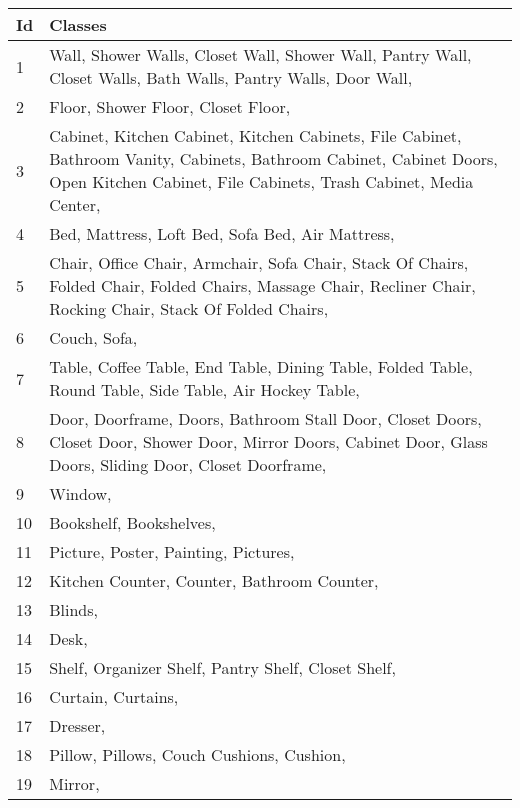     \begin{table}
    \begin{center}
    	\begin{tabular}{ | l | p{17cm} |}
    		\hline
    		
    		\cellcolor{purple!30}Id & \cellcolor{purple!30}Classes \\ \hline
    		
    		1 & Wall, Shower Walls, Closet Wall, Shower Wall, Pantry Wall, Closet Walls, Bath Walls, Pantry Walls, Door Wall, \\ \hline
    		2 & Floor, Shower Floor, Closet Floor, \\ \hline
    		3 & Cabinet, Kitchen Cabinet, Kitchen Cabinets, File Cabinet, Bathroom Vanity, Cabinets, Bathroom Cabinet, Cabinet Doors, Open Kitchen Cabinet, File Cabinets, Trash Cabinet, Media Center, \\ \hline
    		4 & Bed, Mattress, Loft Bed, Sofa Bed, Air Mattress, \\ \hline
    		5 & Chair, Office Chair, Armchair, Sofa Chair, Stack Of Chairs, Folded Chair, Folded Chairs, Massage Chair, Recliner Chair, Rocking Chair, Stack Of Folded Chairs, \\ \hline
    		6 & Couch, Sofa, \\ \hline
    		7 & Table, Coffee Table, End Table, Dining Table, Folded Table, Round Table, Side Table, Air Hockey Table, \\ \hline
    		8 & Door, Doorframe, Doors, Bathroom Stall Door, Closet Doors, Closet Door, Shower Door, Mirror Doors, Cabinet Door, Glass Doors, Sliding Door, Closet Doorframe, \\ \hline
    		9 & Window, \\ \hline
    		10 & Bookshelf, Bookshelves, \\ \hline
    		11 & Picture, Poster, Painting, Pictures, \\ \hline
    		12 & Kitchen Counter, Counter, Bathroom Counter, \\ \hline
    		13 & Blinds, \\ \hline
    		14 & Desk, \\ \hline
    		15 & Shelf, Organizer Shelf, Pantry Shelf, Closet Shelf, \\ \hline
    		16 & Curtain, Curtains, \\ \hline
    		17 & Dresser, \\ \hline
    		18 & Pillow, Pillows, Couch Cushions, Cushion, \\ \hline
    		19 & Mirror, \\ \hline

\end{tabular}
\end{center}
\end{table}
